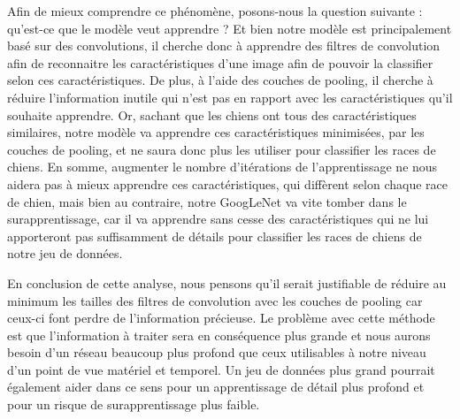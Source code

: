\documentclass{article}
\begin{document}
Afin de mieux comprendre ce phénomène, posons-nous la question suivante :
qu’est-ce que le modèle veut apprendre ? Et bien notre modèle est principalement
basé sur des convolutions, il cherche donc à apprendre des filtres de
convolution afin de reconnaitre les caractéristiques d’une image afin de pouvoir
la classifier selon ces caractéristiques. De plus, à l’aide des couches de
pooling, il cherche à réduire l’information inutile qui n’est pas en rapport
avec les caractéristiques qu’il souhaite apprendre. Or, sachant que les chiens
ont tous des caractéristiques similaires, notre modèle va apprendre ces
caractéristiques minimisées, par les couches de pooling, et ne saura donc plus
les utiliser pour classifier les races de chiens. En somme, augmenter le nombre
d’itérations de l’apprentissage ne nous aidera pas à mieux apprendre ces
caractéristiques, qui diffèrent selon chaque race de chien, mais bien au
contraire, notre GoogLeNet va vite tomber dans le surapprentissage, car il va
apprendre sans cesse des caractéristiques qui ne lui apporteront pas
suffisamment de détails pour classifier les races de chiens de notre jeu de
données. 

En conclusion de cette analyse, nous pensons qu’il serait justifiable de réduire
au minimum les tailles des filtres de convolution avec les couches de pooling
car ceux-ci font perdre de l’information précieuse. Le problème avec cette
méthode est que l’information à traiter sera en conséquence plus grande et nous
aurons besoin d’un réseau beaucoup plus profond que ceux utilisables à notre
niveau d’un point de vue matériel et temporel. Un jeu de données plus grand
pourrait également aider dans ce sens pour un apprentissage de détail plus
profond et pour un risque de surapprentissage plus faible.



\end{document}
